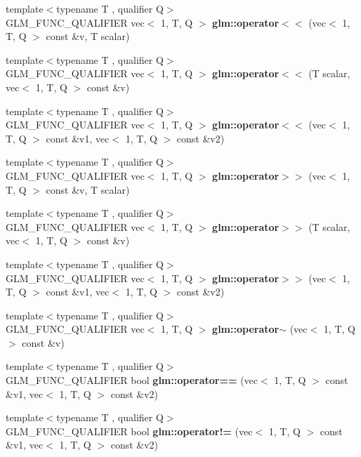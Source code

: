 \begin{DoxyCompactItemize}
\item 
{\footnotesize template$<$typename T , qualifier Q$>$ }\\G\+L\+M\+\_\+\+F\+U\+N\+C\+\_\+\+Q\+U\+A\+L\+I\+F\+I\+ER vec$<$ 1, T, Q $>$ {\bfseries glm\+::operator$<$$<$} (vec$<$ 1, T, Q $>$ const \&v, T scalar)
\item 
{\footnotesize template$<$typename T , qualifier Q$>$ }\\G\+L\+M\+\_\+\+F\+U\+N\+C\+\_\+\+Q\+U\+A\+L\+I\+F\+I\+ER vec$<$ 1, T, Q $>$ {\bfseries glm\+::operator$<$$<$} (T scalar, vec$<$ 1, T, Q $>$ const \&v)
\item 
{\footnotesize template$<$typename T , qualifier Q$>$ }\\G\+L\+M\+\_\+\+F\+U\+N\+C\+\_\+\+Q\+U\+A\+L\+I\+F\+I\+ER vec$<$ 1, T, Q $>$ {\bfseries glm\+::operator$<$$<$} (vec$<$ 1, T, Q $>$ const \&v1, vec$<$ 1, T, Q $>$ const \&v2)
\item 
{\footnotesize template$<$typename T , qualifier Q$>$ }\\G\+L\+M\+\_\+\+F\+U\+N\+C\+\_\+\+Q\+U\+A\+L\+I\+F\+I\+ER vec$<$ 1, T, Q $>$ {\bfseries glm\+::operator$>$$>$} (vec$<$ 1, T, Q $>$ const \&v, T scalar)
\item 
{\footnotesize template$<$typename T , qualifier Q$>$ }\\G\+L\+M\+\_\+\+F\+U\+N\+C\+\_\+\+Q\+U\+A\+L\+I\+F\+I\+ER vec$<$ 1, T, Q $>$ {\bfseries glm\+::operator$>$$>$} (T scalar, vec$<$ 1, T, Q $>$ const \&v)
\item 
{\footnotesize template$<$typename T , qualifier Q$>$ }\\G\+L\+M\+\_\+\+F\+U\+N\+C\+\_\+\+Q\+U\+A\+L\+I\+F\+I\+ER vec$<$ 1, T, Q $>$ {\bfseries glm\+::operator$>$$>$} (vec$<$ 1, T, Q $>$ const \&v1, vec$<$ 1, T, Q $>$ const \&v2)
\item 
{\footnotesize template$<$typename T , qualifier Q$>$ }\\G\+L\+M\+\_\+\+F\+U\+N\+C\+\_\+\+Q\+U\+A\+L\+I\+F\+I\+ER vec$<$ 1, T, Q $>$ {\bfseries glm\+::operator$\sim$} (vec$<$ 1, T, Q $>$ const \&v)
\item 
{\footnotesize template$<$typename T , qualifier Q$>$ }\\G\+L\+M\+\_\+\+F\+U\+N\+C\+\_\+\+Q\+U\+A\+L\+I\+F\+I\+ER bool {\bfseries glm\+::operator==} (vec$<$ 1, T, Q $>$ const \&v1, vec$<$ 1, T, Q $>$ const \&v2)
\item 
{\footnotesize template$<$typename T , qualifier Q$>$ }\\G\+L\+M\+\_\+\+F\+U\+N\+C\+\_\+\+Q\+U\+A\+L\+I\+F\+I\+ER bool {\bfseries glm\+::operator!=} (vec$<$ 1, T, Q $>$ const \&v1, vec$<$ 1, T, Q $>$ const \&v2)

\end{DoxyCompactItemize}
